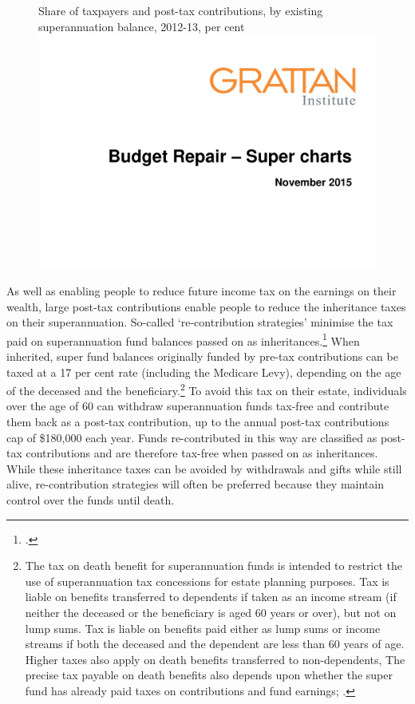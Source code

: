 \documentclass{grattanAlpha}
\begin{document}
\begin{figure}
%
{Share of taxpayers and post-tax contributions, by existing superannuation balance, 2012-13, per cent}
\includegraphics[width=\columnwidth,page=30]{super-atlas/PPTX.pdf}
\end{figure}

As well as enabling people to reduce future income tax on the earnings on their wealth, large post-tax contributions enable people to reduce the inheritance taxes on their superannuation. So-called ‘re-contribution strategies’ minimise the tax paid on superannuation fund balances passed on as inheritances.\footcite[][26]{RiceWarner2015SubmissionFSI}  When inherited, super fund balances originally funded by pre-tax contributions can be taxed at a 17 per cent rate (including the Medicare Levy), depending on the age of the deceased and the beneficiary.\footnote{The tax on death benefit for superannuation funds is intended to restrict the use of superannuation tax concessions for estate planning purposes. Tax is liable on benefits transferred to dependents if taken as an income stream (if neither the deceased or the beneficiary is aged 60 years or over), but not on lump sums. Tax is liable on benefits paid either as lump sums or income streams if both the deceased and the dependent are less than 60 years of age. Higher taxes also apply on death benefits transferred to non-dependents, The precise tax payable on death benefits also depends upon whether the super fund has already paid taxes on contributions and fund earnings; \textcite{ATO2015DeathBenefits}.}  To avoid this tax on their estate, individuals over the age of 60 can withdraw superannuation funds tax-free and contribute them back as a post-tax contribution, up to the annual post-tax contributions cap of \$180,000 each year. Funds re-contributed in this way are classified as post-tax contributions and are therefore tax-free when passed on as inheritances. While these inheritance taxes can be avoided by withdrawals and gifts while still alive, re-contribution strategies will often be preferred because they maintain control over the funds until death.
\end{document}
